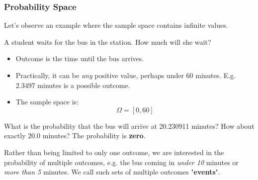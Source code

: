 \documentclass{beamer}
\begin{document}
\begin{frame}
\frametitle{Probability Space}
    Let's observe an example where the sample space contains infinite values.

    \pause
    \begin{example}
        A student waits for the bus in the station. How much will she wait?
        \begin{itemize}
            \item Outcome is the time until the bus arrives.
            \item Practically, it can be \textit{any} positive value, perhaps under 60 minutes. E.g. $2.3497$ minutes is a possible outcome. 
            \item The sample space is:
            $$\Omega = [0, 60]$$
        \end{itemize}
    \end{example}

    \pause

    \begin{block}

        What is the probability that the bus will arrive at 20.230911 minutes?
        \pause
        How about exactly $20.0$ minutes? \pause The probability is \textbf{zero}.
    \end{block}

    \pause
    Rather than being limited to only one outcome, we are interested in the probability of multiple outcomes, e.g. the bus coming in \textit{under 10} minutes or \textit{more than 5} minutes.  We call such sets of multiple outcomes "\textbf{events}".
    
\end{frame}

\end{document}

